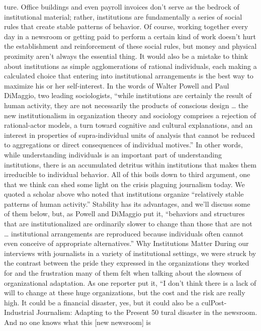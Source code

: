 ture. Office buildings and even payroll invoices don’t serve as the bedrock of
institutional material; rather, institutions are fundamentally a series of social rules
that create stable patterns of behavior. Of course, working together every day in
a newsroom or getting paid to perform a certain kind of work doesn’t hurt the
establishment and reinforcement of these social rules, but money and physical
proximity aren’t always the essential thing.
It would also be a mistake to think about institutions as simple agglomerations
of rational individuals, each making a calculated choice that entering into institutional
arrangements is the best way to maximize his or her self-interest. In
the words of Walter Powell and Paul DiMaggio, two leading sociologists, ``while
institutions are certainly the result of human activity, they are not necessarily the
products of conscious design … the new institutionalism in organization theory
and sociology comprises a rejection of rational-actor models, a turn toward cognitive
and cultural explanations, and an interest in properties of supra-individual
units of analysis that cannot be reduced to aggregations or direct consequences of
individual motives.'' In other words, while understanding individuals is an important
part of understanding institutions, there is an accumulated detritus within
institutions that makes them irreducible to individual behavior.
All of this boils down to third argument, one that we think can shed some light
on the crisis plaguing journalism today. We quoted a scholar above who noted that
institutions organize ``relatively stable patterns of human activity.'' Stability has its
advantages, and we’ll discuss some of them below, but, as Powell and DiMaggio
put it, ``behaviors and structures that are institutionalized are ordinarily slower
to change than those that are not … institutional arrangements are reproduced
because individuals often cannot even conceive of appropriate alternatives.''
Why Institutions Matter
During our interviews with journalists in a variety of institutional settings, we
were struck by the contrast between the pride they expressed in the organizations
they worked for and the frustration many of them felt when talking about
the slowness of organizational adaptation. As one reporter put it, ``I don’t think
there is a lack of will to change at these huge organizations, but the cost and the
risk are really high. It could be a financial disaster, yes, but it could also be a culPost-
Industrial Journalism: Adapting to the Present
50
tural disaster in the newsroom. And no one knows what this [new newsroom] is
